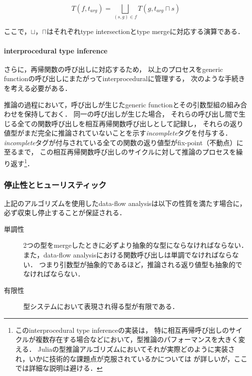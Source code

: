 \[
  T(f,t_{arg}) = \bigsqcup_{(s,g) \in f}T(g,t_{arg} \sqcap s)
\]

ここで，$\sqcup$，$\sqcap$はそれぞれtype intersectionとtype mergeに対応する演算である．


\paragraph{interprocedural type inference}

さらに，再帰関数の呼び出しに対応するため，
以上のプロセスをgeneric functionの呼び出しにまたがってinterproceduralに管理する，
次のような手続きを考える必要がある．

推論の過程において，呼び出しが生じたgeneric functionとその引数型組の組み合わせを保持しておく．
同一の呼び出しが生じた場合，
それらの呼び出し間で生じる全ての関数呼び出しを相互再帰関数呼び出しとして記録し，
それらの返り値型がまだ完全に推論されていないことを示す\textit{incomplete}タグを付与する．
\textit{incomplete}タグが付与されている全ての関数の返り値型がfix-point（不動点）に至るまで，
この相互再帰関数呼び出しのサイクルに対して推論のプロセスを繰り返す\footnote{
  このinterprocedural type inferenceの実装は，
  特に相互再帰呼び出しのサイクルが複数存在する場合などにおいて，型推論のパフォーマンスを大きく変える．
  Juliaの型推論アルゴリズムにおいてそれが実際どのように実装され，いかに技術的な課題点が克服されているかについては
  \cite{jameson, jameson-revisited}が詳しいが，ここでは詳細な説明は避ける．
}．

\subsubsection{停止性とヒューリスティック} \label{subsubsection:inference-termination-and-heuristic}

上記のアルゴリズムを使用したdata-flow analysisは以下の性質を満たす場合に，
必ず収束し停止することが保証される\cite{graph-free-data-flow-analysis, jameson}．

\begin{description}
  \item [単調性] 2つの型をmergeしたときに必ずより抽象的な型にならなければならない．
                また，data-flow analysisにおける関数呼び出しは単調でなければならない．
                つまり引数型が抽象的であるほど，推論される返り値型も抽象的でなければならない．
  \item [有限性] 型システムにおいて表現され得る型が有限である．
\end{description}

